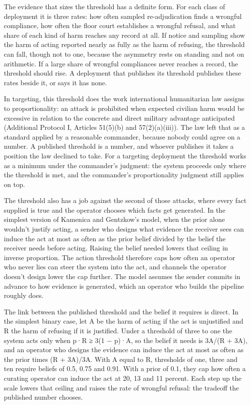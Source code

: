 The evidence that sizes the threshold has a definite form. For each class of deployment it is three rates: how often sampled re-adjudication finds a wrongful compliance, how often the floor court establishes a wrongful refusal, and what share of each kind of harm reaches any record at all. If notice and sampling show the harm of acting reported nearly as fully as the harm of refusing, the threshold can fall, though not to one, because the asymmetry rests on standing and not on arithmetic. If a large share of wrongful compliances never reaches a record, the threshold should rise. A deployment that publishes its threshold publishes these rates beside it, or says it has none.

In targeting, this threshold does the work international humanitarian law assigns to proportionality: an attack is prohibited when expected civilian harm would be excessive in relation to the concrete and direct military advantage anticipated (Additional Protocol I, Articles 51(5)(b) and 57(2)(a)(iii)). The law left that as a standard applied by a reasonable commander, because nobody could agree on a number. A published threshold is a number, and whoever publishes it takes a position the law declined to take. For a targeting deployment the threshold works as a minimum under the commander's judgment: the system proceeds only where the threshold is met, and the commander's proportionality judgment still applies on top.

The threshold also has a job against the second of those attacks, where every fact supplied is true and the operator chooses which facts get generated. In the simplest version of Kamenica and Gentzkow's model, when the prior alone wouldn't justify acting, a sender who designs what evidence the receiver sees can induce the act at most as often as the prior belief divided by the belief the receiver needs before acting. Raising the belief needed lowers that ceiling in inverse proportion. The action threshold therefore caps how often an operator who never lies can steer the system into the act, and channels the operator doesn't design lower the cap further. The model assumes the sender commits in advance to how evidence is generated, which an operator who builds the pipeline roughly does.

The link between the published threshold and the belief it requires is direct. In the simplest binary case, let A be the harm of acting if the act is unjustified and R the harm of refusing if it is justified. Under a threshold of three to one the system acts only when p·R ≥ 3(1 − p)·A, so the belief it needs is 3A/(R + 3A), and an operator who designs the evidence can induce the act at most as often as the prior times (R + 3A)/3A. With A equal to R, thresholds of one, three and ten require beliefs of 0.5, 0.75 and 0.91. With a prior of 0.1, they cap how often a curating operator can induce the act at 20, 13 and 11 percent. Each step up the scale lowers that ceiling and raises the rate of wrongful refusal: the tradeoff the published number chooses.

